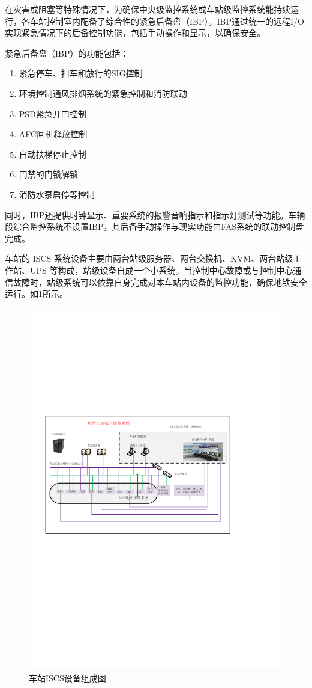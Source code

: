 在灾害或阻塞等特殊情况下，为确保中央级监控系统或车站级监控系统能持续运行，各车站控制室内配备了综合性的紧急后备盘（IBP）。IBP通过统一的远程I/O实现紧急情况下的后备控制功能，包括手动操作和显示，以确保安全。

紧急后备盘（IBP）的功能包括：

\begin{enumerate}
	\item 紧急停车、扣车和放行的SIG控制
	\item 环境控制通风排烟系统的紧急控制和消防联动
	\item PSD紧急开门控制
	\item AFC闸机释放控制
	\item 自动扶梯停止控制
	\item 门禁的门锁解锁
	\item 消防水泵启停等控制
\end{enumerate}

同时，IBP还提供时钟显示、重要系统的报警音响指示和指示灯测试等功能。车辆段综合监控系统不设置IBP，其后备手动操作与现实功能由FAS系统的联动控制盘完成。

车站的 ISCS 系统设备主要由两台站级服务器、两台交换机、KVM、两台站级工作站、UPS 等构成，站级设备自成一个小系统。当控制中心故障或与控制中心通信故障时，站级系统可以依靠自身完成对本车站内设备的监控功能，确保地铁安全运行。如\ref{fig:车站ISCS设备组成图}所示。

\begin{figure}[h]
	\centering
	\includegraphics[width=0.7\linewidth]{figures/车站ISCS设备组成图.pdf}
	\caption{车站ISCS设备组成图}
	\label{fig:车站ISCS设备组成图}
\end{figure}

